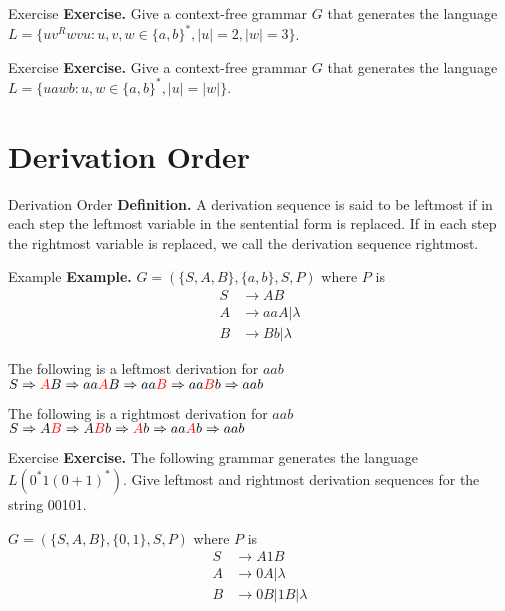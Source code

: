 \documentclass[10pt]{beamer}
\begin{document}
\begin{frame}[t]{Exercise}
    \textbf{Exercise.} Give a context-free grammar $G$ that generates the language $L = \{uv^Rwvu : u,v,w \in \{a,b\}^*, |u| = 2, |w| = 3 \}$.
\end{frame}

\begin{frame}[t]{Exercise}
    \textbf{Exercise.} Give a context-free grammar $G$ that generates the language $L = \{uawb : u,w \in \{a,b\}^*, |u| = |w| \}$.
\end{frame}

\section{Derivation Order}

\begin{frame}{Derivation Order}
    \textbf{Definition.} A derivation sequence is said to be leftmost if in each step the leftmost variable in the sentential form is replaced. If in each step the rightmost variable is replaced, we call the derivation sequence rightmost.
\end{frame}

\begin{frame}{Example}
    \textbf{Example.} $G = (\{S,A,B\}, \{a,b\}, S, P)$ where $P$ is
    \begin{align*}
        S & \rightarrow AB          \\
        A & \rightarrow aaA|\lambda \\
        B & \rightarrow Bb|\lambda
    \end{align*}

    The following is a leftmost derivation for $aab$ $S \Rightarrow \textcolor{red}{A}B \Rightarrow aa\textcolor{red}{A}B \Rightarrow aa\textcolor{red}{B} \Rightarrow aa\textcolor{red}{B}b \Rightarrow aab$

    The following is a rightmost derivation for $aab$ $S \Rightarrow A\textcolor{red}{B} \Rightarrow A\textcolor{red}{B}b \Rightarrow \textcolor{red}{A}b \Rightarrow aa\textcolor{red}{A}b \Rightarrow aab$
\end{frame}

\begin{frame}[t]{Exercise}
    \textbf{Exercise.} The following grammar generates the language $L(0^*1(0+1)^*)$. Give leftmost and rightmost derivation sequences for the string 00101.

    $G = (\{S,A,B\}, \{0,1\}, S, P)$ where $P$ is
    \begin{align*}
        S & \rightarrow A1B           \\
        A & \rightarrow 0A|\lambda    \\
        B & \rightarrow 0B|1B|\lambda
    \end{align*}

\end{frame}
\end{document}
